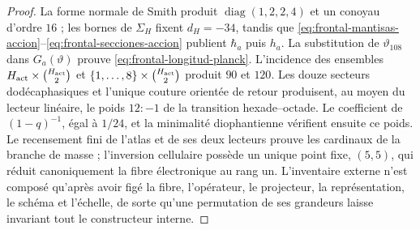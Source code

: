 \begin{proof}
La forme normale de Smith produit
\(\operatorname{diag}(1,2,2,4)\) et un conoyau d'ordre \(16\) ; les bornes de
\(\Sigma_H\) fixent \(d_H=-34\), tandis que
\eqref{eq:frontal-mantisas-accion}--\eqref{eq:frontal-secciones-accion}
publient \(\hbar_a\) puis \(h_a\). La substitution de
\(\vartheta_{108}\) dans \(G_a(\vartheta)\) prouve
\eqref{eq:frontal-longitud-planck}. L'incidence des ensembles
\(H_{\rm act}\times\binom{H_{\rm act}}2\) et
\(\{1,\ldots,8\}\times\binom{H_{\rm act}}2\) produit \(90\) et \(120\).
Les douze secteurs dodécaphasiques et l'unique couture orientée de retour
produisent, au moyen du lecteur linéaire, le poids \(12{:}{-}1\) de la transition
hexade--octade. Le coefficient de \((1-q)^{-1}\), égal à \(1/24\), et la
minimalité diophantienne vérifient ensuite ce poids. Le recensement fini de l'atlas et de ses deux lecteurs
prouve les cardinaux de la branche de masse ; l'inversion cellulaire possède un unique
point fixe, \((5,5)\), qui réduit canoniquement la fibre électronique au rang
un. L'inventaire externe n'est composé qu'après avoir figé la fibre,
l'opérateur, le projecteur, la représentation, le schéma et l'échelle, de sorte qu'une
permutation de ses grandeurs laisse invariant tout le constructeur interne.
\end{proof}
